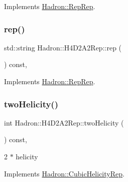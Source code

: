 Implements \mbox{\hyperlink{structHadron_1_1RepRep_ab3213025f6de249f7095892109575fde}{Hadron\+::\+Rep\+Rep}}.

\mbox{\label{structHadron_1_1H4D2A2Rep_a144c2d98d82e71971a810610f10199d3}} 
\subsubsection{\texorpdfstring{rep()}{rep()}\hspace{0.1cm}{\footnotesize\ttfamily [5/5]}}
{\footnotesize\ttfamily std\+::string Hadron\+::\+H4\+D2\+A2\+Rep\+::rep (\begin{DoxyParamCaption}{ }\end{DoxyParamCaption}) const\hspace{0.3cm}{\ttfamily [inline]}, {\ttfamily [virtual]}}



Implements \mbox{\hyperlink{structHadron_1_1RepRep_ab3213025f6de249f7095892109575fde}{Hadron\+::\+Rep\+Rep}}.

\mbox{\label{structHadron_1_1H4D2A2Rep_a2d246b554a8500cb82a99cd8139bf313}} 
\subsubsection{\texorpdfstring{twoHelicity()}{twoHelicity()}\hspace{0.1cm}{\footnotesize\ttfamily [1/3]}}
{\footnotesize\ttfamily int Hadron\+::\+H4\+D2\+A2\+Rep\+::two\+Helicity (\begin{DoxyParamCaption}{ }\end{DoxyParamCaption}) const\hspace{0.3cm}{\ttfamily [inline]}, {\ttfamily [virtual]}}

2 $\ast$ helicity 

Implements \mbox{\hyperlink{structHadron_1_1CubicHelicityRep_af507aa56fc2747eacc8cb6c96db31ecc}{Hadron\+::\+Cubic\+Helicity\+Rep}}.

\mbox{\label{structHadron_1_1H4D2A2Rep_a2d246b554a8500cb82a99cd8139bf313}} 
